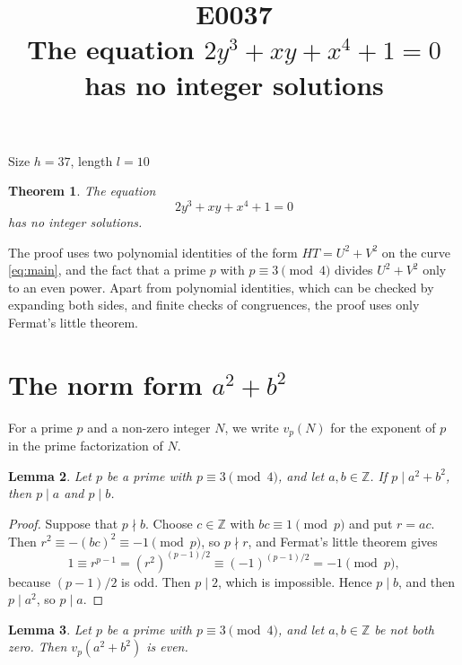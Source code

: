\documentclass[11pt]{article}
\title{\textbf{E0037}\\[4pt] The equation $2y^3+xy+x^4+1=0$ has no integer solutions}
\author{}
\date{}
\newtheorem{theorem}{Theorem}
\newtheorem{lemma}[theorem]{Lemma}
\newcommand{\Z}{\mathbb{Z}}
\begin{document}
\maketitle
\vspace{-8ex}
\begin{center}
Size $h=37$, length $l=10$
\end{center}

\begin{theorem}\label{thm:main}
The equation
\begin{equation}\label{eq:main}
2y^3+xy+x^4+1=0
\end{equation}
has no integer solutions.
\end{theorem}

The proof uses two polynomial identities of the form $HT=U^2+V^2$ on the curve \eqref{eq:main}, and the fact that a prime $p$ with $p\equiv3\pmod4$ divides $U^2+V^2$ only to an even power. Apart from polynomial identities, which can be checked by expanding both sides, and finite checks of congruences, the proof uses only Fermat's little theorem.

\section{\texorpdfstring{The norm form $a^2+b^2$}{The norm form}}

For a prime $p$ and a non-zero integer $N$, we write $v_p(N)$ for the exponent of $p$ in the prime factorization of $N$.

\begin{lemma}\label{lem:divides}
Let $p$ be a prime with $p\equiv3\pmod4$, and let $a,b\in\Z$. If $p\mid a^2+b^2$, then $p\mid a$ and $p\mid b$.
\end{lemma}

\begin{proof}
Suppose that $p\nmid b$. Choose $c\in\Z$ with $bc\equiv1\pmod p$ and put $r=ac$. Then $r^2\equiv-(bc)^2\equiv-1\pmod p$, so $p\nmid r$, and Fermat's little theorem gives
\[
1\equiv r^{p-1}=(r^2)^{(p-1)/2}\equiv(-1)^{(p-1)/2}=-1\pmod p,
\]
because $(p-1)/2$ is odd. Then $p\mid2$, which is impossible. Hence $p\mid b$, and then $p\mid a^2$, so $p\mid a$.
\end{proof}

\begin{lemma}\label{lem:even}
Let $p$ be a prime with $p\equiv3\pmod4$, and let $a,b\in\Z$ be not both zero. Then $v_p(a^2+b^2)$ is even.
\end{lemma}
\end{document}
